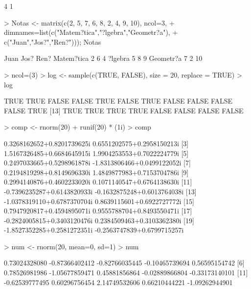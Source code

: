 \documentclass{article}
\begin{document}
\begin{Schunk}
\begin{Soutput}
[1] 4 1
\end{Soutput}
\begin{Sinput}
> Notas <- matrix(c(2, 5, 7, 6, 8, 2, 4, 9, 10), ncol=3,
+                 dimnames=list(c("Matem?tica","?lgebra","Geometr?a"),
+                               c("Juan","Jos?","Ren?"))); Notas
\end{Sinput}
\begin{Soutput}
           Juan Jos? Ren?
Matem?tica    2    6    4
?lgebra       5    8    9
Geometr?a     7    2   10
\end{Soutput}
\begin{Sinput}
> ncol=(3)
> log <- sample(c(TRUE, FALSE), size = 20, replace = TRUE)
> log
\end{Sinput}
\begin{Soutput}
 [1]  TRUE  TRUE FALSE FALSE  TRUE FALSE  TRUE FALSE FALSE FALSE FALSE  TRUE
[13]  TRUE  TRUE  TRUE  TRUE FALSE FALSE FALSE FALSE
\end{Soutput}
\begin{Sinput}
> comp <- rnorm(20) + runif(20) * (1i)
> comp
\end{Sinput}
\begin{Soutput}
 [1]  0.3268162652+0.8201739625i  0.6551202575+0.2958150213i
 [3]  1.5167326485+0.6684645915i  1.9904253553+0.7022224779i
 [5]  0.2497033665+0.5298961878i -1.8313806466+0.0499122052i
 [7]  0.2194819298+0.8149696330i  1.4849877983+0.7153704786i
 [9]  0.2994140876+0.4602233020i  0.1071140547+0.6764138630i
[11] -0.7396235287+0.6143820933i -0.1632875248+0.6013764038i
[13] -1.0378319110+0.6787370704i  0.8639115601+0.6922727772i
[15]  0.7947920817+0.4594895071i  0.9555788704+0.8493550471i
[17] -0.2824005815+0.3403120476i  0.2384509463+0.3103362380i
[19] -1.8527352285+0.2581272351i -0.2563747839+0.6799715257i
\end{Soutput}
\begin{Sinput}
> num <- rnorm(20, mean=0, sd=1)
> num
\end{Sinput}
\begin{Soutput}
 [1]  0.73024328080 -0.87366402412 -0.82766035445 -0.10465739694  0.56595154742
 [6]  0.78526981986 -1.05677859471  0.45881856864 -0.02889866804 -0.33173140101
[11] -0.62539777495  0.60296756454  2.14749532606  0.66210444221 -1.09262944901

\end{Soutput}
\end{Schunk}
\end{document}
